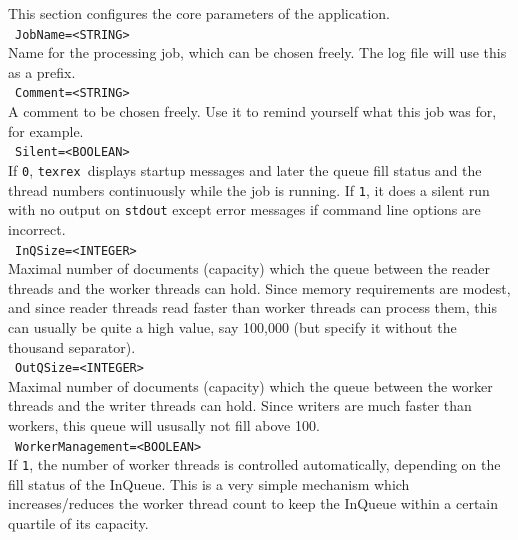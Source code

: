 \documentclass[12pt,a4paper]{article}
\newcommand{\trthis}{\texttt{texrex}}
\begin{document}
This section configures the core parameters of the application.\\

\noindent\textbullet~\texttt{JobName=<STRING>}\\

Name for the processing job, which can be chosen freely.
The log file will use this as a prefix.\\

\noindent\textbullet~\texttt{Comment=<STRING>}\\

A comment to be chosen freely.
Use it to remind yourself what this job was for, for example. \\

\noindent\textbullet~\texttt{Silent=<BOOLEAN>}\\

If \texttt{0}, \trthis\ displays startup messages and later the queue fill status and the thread numbers continuously while the job is running.
If \texttt{1}, it does a silent run with no output on \texttt{stdout} except error messages if command line options are incorrect.\\

\noindent\textbullet~\texttt{InQSize=<INTEGER>}\\

Maximal number of documents (capacity) which the queue between the reader threads and the worker threads can hold.
Since memory requirements are modest, and since reader threads read faster than worker threads can process them, this can usually be quite a high value, say 100,000 (but specify it without the thousand separator).\\

\noindent\textbullet~\texttt{OutQSize=<INTEGER>}\\

Maximal number of documents (capacity) which the queue between the worker threads and the writer threads can hold.
Since writers are much faster than workers, this queue will ususally not fill above 100.\\

\noindent\textbullet~\texttt{WorkerManagement=<BOOLEAN>}\\

If \texttt{1}, the number of worker threads is controlled automatically, depending on the fill status of the InQueue.
This is a very simple mechanism which increases\slash reduces the worker thread count to keep the InQueue within a certain quartile of its capacity.\\
\end{document}
